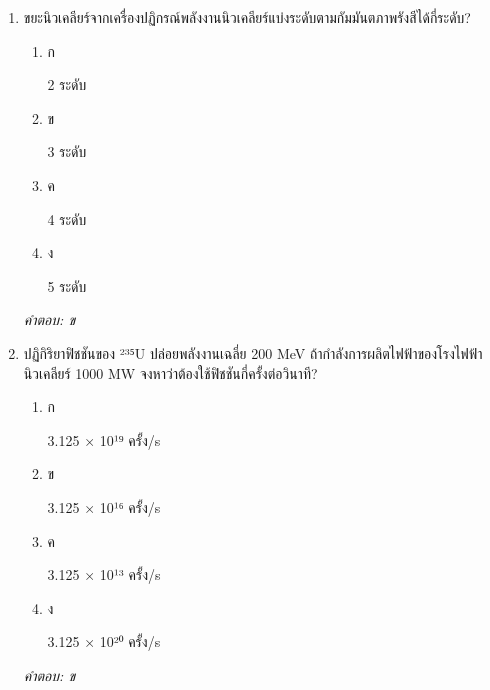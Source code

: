 \documentclass[12pt]{article}
\begin{document}
\begin{enumerate}[label=\arabic*., itemsep=0.5\baselineskip, topsep=0.5\baselineskip, leftmargin=*]
\item ขยะนิวเคลียร์จากเครื่องปฏิกรณ์พลังงานนิวเคลียร์แบ่งระดับตามกัมมันตภาพรังสีได้กี่ระดับ?
\begin{enumerate}[label=\alph*)., itemsep=0.3\baselineskip, topsep=0.3\baselineskip]
\item ก\ 
\begin{minipage}[t]{0.9\linewidth}
\raggedright 2 ระดับ
\end{minipage}
\item ข\ 
\begin{minipage}[t]{0.9\linewidth}
\raggedright 3 ระดับ
\end{minipage}
\item ค\ 
\begin{minipage}[t]{0.9\linewidth}
\raggedright 4 ระดับ
\end{minipage}
\item ง\ 
\begin{minipage}[t]{0.9\linewidth}
\raggedright 5 ระดับ
\end{minipage}
\end{enumerate}
\vspace{-0.3\baselineskip}
\begin{small}
\textit{คำตอบ: ข}
\end{small}

\item ปฏิกิริยาฟิชชันของ ²³⁵U ปล่อยพลังงานเฉลี่ย 200 MeV ถ้ากำลังการผลิตไฟฟ้าของโรงไฟฟ้านิวเคลียร์ 1000 MW จงหาว่าต้องใช้ฟิชชันกี่ครั้งต่อวินาที?
\begin{enumerate}[label=\alph*)., itemsep=0.3\baselineskip, topsep=0.3\baselineskip]
\item ก\ 
\begin{minipage}[t]{0.9\linewidth}
\raggedright 3.125 × 10¹⁹ ครั้ง/s
\end{minipage}
\item ข\ 
\begin{minipage}[t]{0.9\linewidth}
\raggedright 3.125 × 10¹⁶ ครั้ง/s
\end{minipage}
\item ค\ 
\begin{minipage}[t]{0.9\linewidth}
\raggedright 3.125 × 10¹³ ครั้ง/s
\end{minipage}
\item ง\ 
\begin{minipage}[t]{0.9\linewidth}
\raggedright 3.125 × 10²⁰ ครั้ง/s
\end{minipage}
\end{enumerate}
\vspace{-0.3\baselineskip}
\begin{small}
\textit{คำตอบ: ข}
\end{small}


\end{enumerate}
\end{document}
